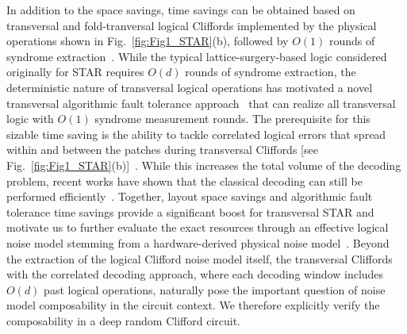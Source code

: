 \documentclass[aps, prx, reprint, superscriptaddress, longbibliography, floatfix]{revtex4-2}
\begin{document}
In addition to the space savings, time savings can be obtained based on transversal and fold-tranversal logical Cliffords implemented by the physical operations shown in Fig.~\ref{fig:Fig1_STAR}(b), followed by $O(1)$ rounds of syndrome extraction~\cite{Cain2025, Zhou2024}. While the typical lattice-surgery-based logic considered originally for STAR requires $O(d)$ rounds of syndrome extraction, the deterministic nature of transversal logical operations has motivated a novel transversal algorithmic fault tolerance approach~\cite{Zhou2024} that can realize all transversal logic with $O(1)$ syndrome measurement rounds. The prerequisite for this sizable time saving is the ability to tackle correlated logical errors that spread within and between the patches during transversal Cliffords [see Fig.~\ref{fig:Fig1_STAR}(b)]~\cite{Cain2025}. While this increases the total volume of the decoding problem, recent works have shown that the classical decoding can still be performed efficiently~\cite{Cain2025, Cain2025b}. Together, layout space savings and algorithmic fault tolerance time savings provide a significant boost for transversal STAR and motivate us to further evaluate the exact resources through an effective logical noise model stemming from a hardware-derived physical noise model~\cite{Evered2023, Bluvstein2025b,  Rodriguez2024}. Beyond the extraction of the logical Clifford noise model itself, the transversal Cliffords with the correlated decoding approach, where each decoding window includes $O(d)$ past logical operations, naturally pose the important question of noise model composability in the circuit context. We therefore explicitly verify the composability in a deep random Clifford circuit.
\end{document}
